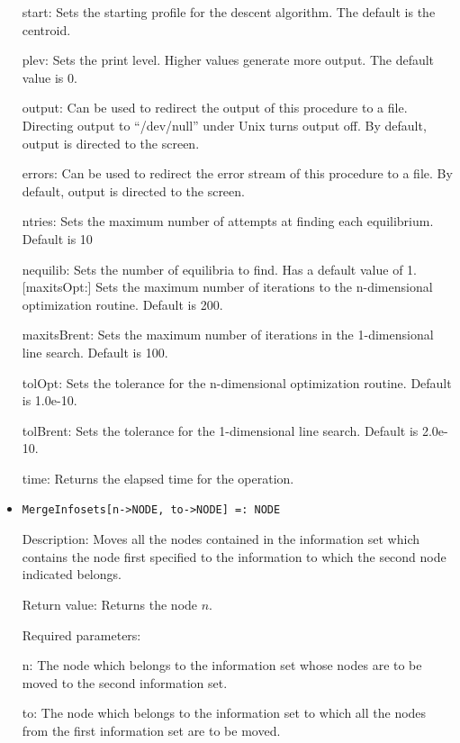 \begin{itemize}
\bd
\item
[start:] Sets the starting profile for the descent algorithm.  The
default is the centroid.
\item
[plev:] Sets the print level.  Higher values generate more output.
The default value is 0.
\item
[output:] Can be used to redirect the output of this procedure to a
file.  Directing output to ``/dev/null'' under Unix turns output off.
By default, output is directed to the screen.
\item
[errors:] Can be used to redirect the error stream of this procedure
to a file.  By default, output is directed to the screen.
\item
[ntries:] Sets the maximum number of attempts at finding each
equilibrium. Default is 10
\item
[nequilib:] Sets the number of equilibria to find.  Has a default
value of 1.  [maxitsOpt:] Sets the maximum number of iterations to the
n-dimensional optimization routine.  Default is 200.
\item
[maxitsBrent:] Sets the maximum number of iterations in the
1-dimensional line search.  Default is 100.
\item
[tolOpt:] Sets the tolerance for the n-dimensional optimization
routine.  Default is 1.0e-10.
\item
[tolBrent:] Sets the tolerance for the 1-dimensional line search.
Default is 2.0e-10.
\item
[time:] Returns the elapsed time for the operation.
\ed
\ed


\item
\protect \large \begin{verbatim}
MergeInfosets[n->NODE, to->NODE] =: NODE
\end{verbatim}\normalsize

\bd
\item
[Description:] Moves all the nodes contained in the information set
which contains the node first specified to the information to which
the second node indicated belongs.
\item
[Return value:] Returns the node $n$.
\item
[Required parameters:]\hfil\null

\bd
\item
[n:] The node which belongs to the information set whose nodes are to
be moved to the second information set.
\item
[to:] The node which belongs to the information set to which all the
nodes from the first information set are to be moved.
\ed


\end{itemize}
